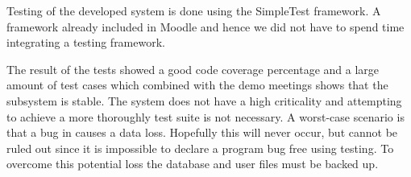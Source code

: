 Testing of the developed system is done using the SimpleTest framework. 
A framework already included in Moodle and hence we did not have to spend time integrating a testing framework.

The result of the tests showed a good code coverage percentage and a large amount of test cases which combined with the demo meetings shows that the subsystem is stable. 
The system does not have a high criticality and attempting to achieve a more thoroughly test suite is not necessary. 
A worst-case scenario is that a bug in \system{} causes a data loss. 
Hopefully this will never occur, but cannot be ruled out since it is impossible to declare a program bug free using testing.
To overcome this potential loss the database and user files must be backed up.
